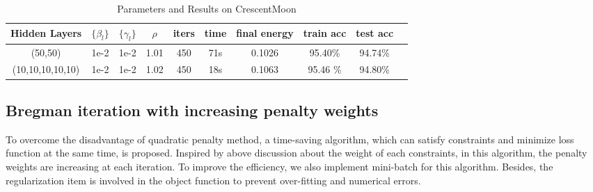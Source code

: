 \documentclass[letterpaper, 10 pt, conference]{ieeeconf}  %
\begin{document}
\begin{table}[h]
\centering
\caption{Parameters and Results on CrescentMoon}
\begin{tabular}{|c|c|c|c|c|c|c|c|c|c|}
\hline
	Hidden Layers & $\{\beta_l\}$ & $\{\gamma_l\}$ & $\rho$ & iters & time & final energy & train acc & test acc\\
\hline
		(50,50) & 1e-2 & 1e-2 & 1.01 & 450 &  71s & 0.1026 & 95.40\% & 94.74\% \\
		(10,10,10,10,10) & 1e-2 & 1e-2 & 1.02 & 450 & 18s & 0.1063 & 95.46 \% & 94.80\% \\ 
\hline
\end{tabular}
\label{tab:parMoon}
\end{table}

\subsection{Bregman iteration with increasing penalty weights}
To overcome the disadvantage of quadratic penalty method, a time-saving algorithm, which can satisfy constraints and minimize loss function at the same time, is proposed. Inspired by above discussion about the weight of each constraints, in this algorithm, the penalty weights are increasing at each iteration. To improve the efficiency, we also implement mini-batch for this algorithm. Besides, the regularization item is involved in the object function to prevent over-fitting and numerical errors.
\end{document}
